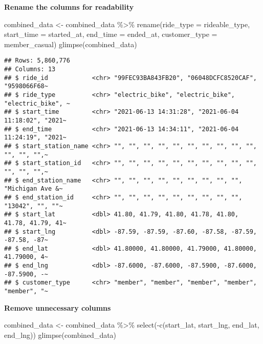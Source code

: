 \documentclass[
]{article}
\newenvironment{Shaded}{\begin{snugshade}}{\end{snugshade}}
\newcommand{\AttributeTok}[1]{\textcolor[rgb]{0.77,0.63,0.00}{#1}}
\newcommand{\FunctionTok}[1]{\textcolor[rgb]{0.00,0.00,0.00}{#1}}
\newcommand{\NormalTok}[1]{#1}
\newcommand{\OtherTok}[1]{\textcolor[rgb]{0.56,0.35,0.01}{#1}}
\newcommand{\SpecialCharTok}[1]{\textcolor[rgb]{0.00,0.00,0.00}{#1}}
\begin{document}
\textbf{Rename the columns for readability}

\begin{Shaded}
\begin{Highlighting}[]
\NormalTok{combined\_data }\OtherTok{\textless{}{-}}\NormalTok{ combined\_data }\SpecialCharTok{\%\textgreater{}\%}
  \FunctionTok{rename}\NormalTok{(}\AttributeTok{ride\_type =}\NormalTok{ rideable\_type, }
         \AttributeTok{start\_time =}\NormalTok{ started\_at,}
         \AttributeTok{end\_time =}\NormalTok{ ended\_at,}
         \AttributeTok{customer\_type =}\NormalTok{ member\_casual)}
\FunctionTok{glimpse}\NormalTok{(combined\_data)}
\end{Highlighting}
\end{Shaded}

\begin{verbatim}
## Rows: 5,860,776
## Columns: 13
## $ ride_id            <chr> "99FEC93BA843FB20", "06048DCFC8520CAF", "9598066F68~
## $ ride_type          <chr> "electric_bike", "electric_bike", "electric_bike", ~
## $ start_time         <chr> "2021-06-13 14:31:28", "2021-06-04 11:18:02", "2021~
## $ end_time           <chr> "2021-06-13 14:34:11", "2021-06-04 11:24:19", "2021~
## $ start_station_name <chr> "", "", "", "", "", "", "", "", "", "", "", "", "",~
## $ start_station_id   <chr> "", "", "", "", "", "", "", "", "", "", "", "", "",~
## $ end_station_name   <chr> "", "", "", "", "", "", "", "", "", "Michigan Ave &~
## $ end_station_id     <chr> "", "", "", "", "", "", "", "", "", "13042", "", ""~
## $ start_lat          <dbl> 41.80, 41.79, 41.80, 41.78, 41.80, 41.78, 41.79, 41~
## $ start_lng          <dbl> -87.59, -87.59, -87.60, -87.58, -87.59, -87.58, -87~
## $ end_lat            <dbl> 41.80000, 41.80000, 41.79000, 41.80000, 41.79000, 4~
## $ end_lng            <dbl> -87.6000, -87.6000, -87.5900, -87.6000, -87.5900, -~
## $ customer_type      <chr> "member", "member", "member", "member", "member", "~
\end{verbatim}

\textbf{Remove unnecessary columns}

\begin{Shaded}
\begin{Highlighting}[]
\NormalTok{combined\_data }\OtherTok{\textless{}{-}}\NormalTok{ combined\_data }\SpecialCharTok{\%\textgreater{}\%}
  \FunctionTok{select}\NormalTok{(}\SpecialCharTok{{-}}\FunctionTok{c}\NormalTok{(start\_lat, start\_lng, end\_lat, end\_lng))}
\FunctionTok{glimpse}\NormalTok{(combined\_data)}
\end{Highlighting}
\end{Shaded}
\end{document}
